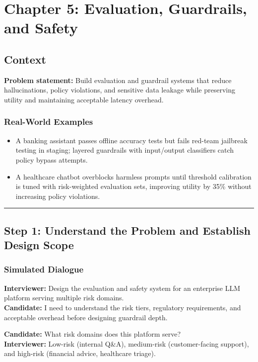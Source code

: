 \chapter{Chapter 5: Evaluation, Guardrails, and Safety}

\section*{Context}

\textbf{Problem statement:} Build evaluation and guardrail systems that reduce hallucinations, policy violations, and sensitive data leakage while preserving utility and maintaining acceptable latency overhead.

\subsection*{Real-World Examples}

\begin{itemize}
  \item A banking assistant passes offline accuracy tests but fails red-team jailbreak testing in staging; layered guardrails with input/output classifiers catch policy bypass attempts.
  \item A healthcare chatbot overblocks harmless prompts until threshold calibration is tuned with risk-weighted evaluation sets, improving utility by 35\% without increasing policy violations.
\end{itemize}

\bigskip\hrule\bigskip

\section*{Step 1: Understand the Problem and Establish Design Scope}

\subsection*{Simulated Dialogue}

\textbf{Interviewer:} Design the evaluation and safety system for an enterprise LLM platform serving multiple risk domains.\\
\textbf{Candidate:} I need to understand the risk tiers, regulatory requirements, and acceptable overhead before designing guardrail depth.

\textbf{Candidate:} What risk domains does this platform serve?\\
\textbf{Interviewer:} Low-risk (internal Q\&A), medium-risk (customer-facing support), and high-risk (financial advice, healthcare triage).

